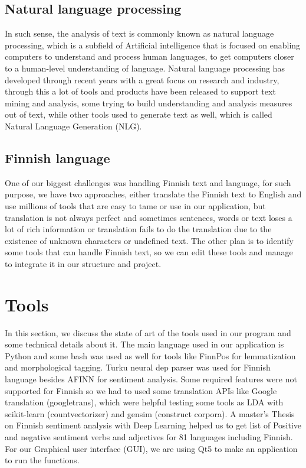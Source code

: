 \documentclass[conference]{IEEEtran}
\begin{document}
\subsection{Natural language processing}
In such sense, the analysis of text is commonly known as natural language processing, which is a subfield of Artificial intelligence that is focused on enabling computers to understand and process human languages, to get computers closer to a human-level understanding of language. Natural language processing has developed through recent years with a great focus on research and industry, through this a lot of tools and products have been released to support text mining and analysis, some trying to build understanding and analysis measures out of text, while other tools used to generate text as well, which is called Natural Language Generation (NLG).

\subsection{Finnish language}
One of our biggest challenges was handling Finnish text and language, for such purpose, we have two approaches, either translate the Finnish text to English and use millions of tools that are easy to tame or use in our application, but translation is not always perfect and sometimes sentences, words or text loses a lot of rich information or translation fails to do the translation due to the existence of unknown characters or undefined text. The other plan is to identify some tools that can handle Finnish text, so we can edit these tools and manage to integrate it in our structure and project.

\section{Tools}
In this section, we discuss the state of art of the tools used in our program and some technical details about it. The main language used in our application is Python and some bash was used as well for tools like FinnPos for lemmatization and morphological tagging. Turku neural dep parser was used for Finnish language besides AFINN for sentiment analysis. Some required features were not supported for Finnish so we had to used some translation APIs like Google translation (googletrans), which were helpful testing some tools as LDA with scikit-learn (countvectorizer) and gensim (construct corpora). A master’s Thesis on Finnish sentiment analysis with Deep Learning helped us to get list of Positive and negative sentiment verbs and adjectives for 81 languages including Finnish. For our Graphical user interface (GUI), we are using Qt5 to make an application to run the functions.
\end{document}
